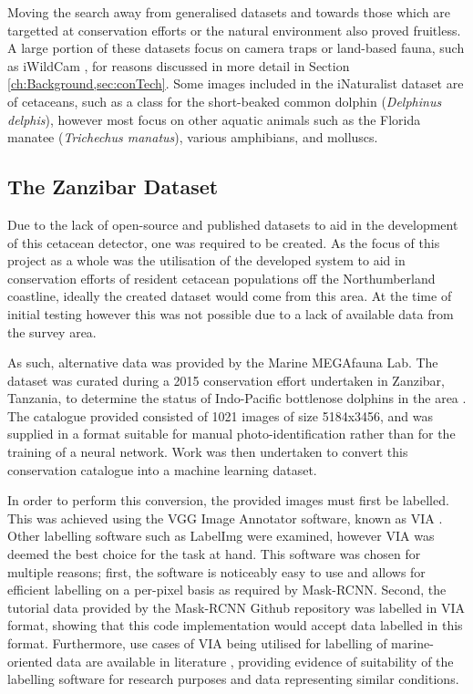 Moving the search away from generalised datasets and towards those which are targetted at conservation efforts or the natural environment also proved fruitless. A large portion of these datasets focus on camera traps or land-based fauna, such as iWildCam \cite{beery_iwildcam_2019}, for reasons discussed in more detail in Section \ref{ch:Background,sec:conTech}. Some images included in the iNaturalist dataset \cite{van_horn_inaturalist_2018} are of cetaceans, such as a class for the short-beaked common dolphin (\textit{Delphinus delphis}), however most focus on other aquatic animals such as the Florida manatee (\textit{Trichechus manatus}), various amphibians, and molluscs. 

\subsection{The Zanzibar Dataset}\label{ch:cetDet,sec:initialTesting,sub:zanzibar}

Due to the lack of open-source and published datasets to aid in the development of this cetacean detector, one was required to be created. As the focus of this project as a whole was the utilisation of the developed system to aid in conservation efforts of resident cetacean populations off the Northumberland coastline, ideally the created dataset would come from this area. At the time of initial testing however this was not possible due to a lack of available data from the survey area.

As such, alternative data was provided by the Marine MEGAfauna Lab. The dataset was curated during a 2015 conservation effort undertaken in Zanzibar, Tanzania, to determine the status of Indo-Pacific bottlenose dolphins in the area \cite{sharpe_indian_2019}. The catalogue provided consisted of 1021 images of size 5184x3456, and was supplied in a format suitable for manual photo-identification rather than for the training of a neural network. Work was then undertaken to convert this conservation catalogue into a machine learning dataset. 

In order to perform this conversion, the provided images must first be labelled. This was achieved using the VGG Image Annotator software, known as VIA \cite{dutta_via_2019}. Other labelling software such as LabelImg \cite{tzutalin_labelimg_2021} were examined, however VIA was deemed the best choice for the task at hand. This software was chosen for multiple reasons; first, the software is noticeably easy to use and allows for efficient labelling on a per-pixel basis as required by Mask-RCNN. Second, the tutorial data provided by the Mask-RCNN Github repository was labelled in VIA format, showing that this code implementation would accept data labelled in this format. Furthermore, use cases of VIA being utilised for labelling of marine-oriented data are available in literature \cite{nita_cnn-based_2020}, providing evidence of suitability of the labelling software for research purposes and data representing similar conditions.


